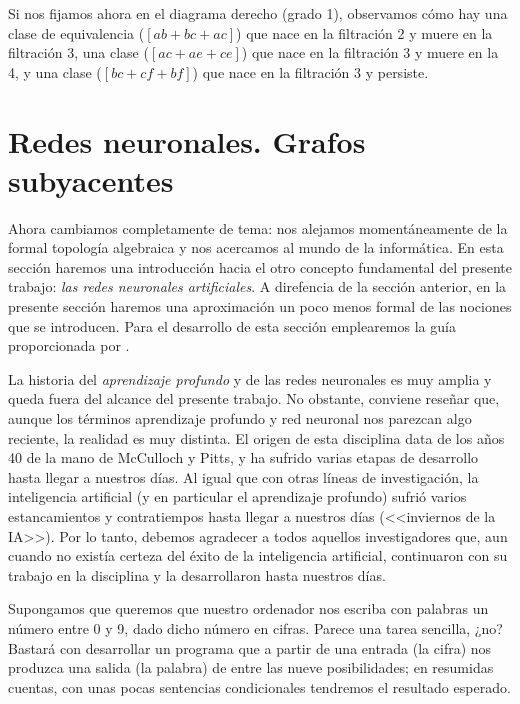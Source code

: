 \documentclass[12pt, a4paper, twoside]{book}
\numberwithin{equation}{section}
\theoremstyle{definition}
\newenvironment{ejem}
  {\pushQED{\qed}\renewcommand{\qedsymbol}{$\blacktriangleleft$}\ejemplo}
  {\popQED\endejemplo}
\theoremstyle{remark}
\theoremstyle{plain}
\begin{document}
\begin{ejem}
	Si nos fijamos ahora en el diagrama derecho (grado 1), observamos cómo
	hay una clase de equivalencia ($[ab+bc+ac]$) que nace en la filtración 
	2
	y muere en la filtración 3, una clase ($[ac+ae+ce]$) que nace en la 
	filtración 3 y muere en la 4, y una clase ($[bc+cf+bf]$) que nace en 
	la 
	filtración 3 y persiste.

	\end{ejem}

	\section{Redes neuronales. Grafos subyacentes}
	
	Ahora cambiamos completamente de tema: nos alejamos momentáneamente de 
	la formal topología algebraica y nos acercamos al mundo 
	de la informática. En esta sección haremos una
	introducción hacia el otro concepto fundamental del presente trabajo: 
	\emph{las redes neuronales artificiales}. A direfencia de la sección 
	anterior, en la presente sección haremos una aproximación un poco menos 
	formal de las nociones que se introducen. Para el desarrollo de esta 
	sección emplearemos la guía proporcionada por 
	\cite{Goodfellow-et-al-2016,IA-Jonathan,MDiscreta-Guti}.

	La historia del \emph{aprendizaje profundo} y de las redes neuronales 
	es muy amplia y queda fuera del alcance del presente trabajo. No 
	obstante, conviene reseñar que, aunque los términos aprendizaje 
	profundo y red neuronal nos parezcan algo reciente, la realidad es muy
	distinta. El origen de esta disciplina data de los años 40 de la mano
	de McCulloch y Pitts, y ha sufrido varias etapas de desarrollo hasta 
	llegar a nuestros días. Al igual que con otras líneas de 
	investigación, la inteligencia artificial (y en particular el 
	aprendizaje profundo) sufrió varios estancamientos y contratiempos 
	hasta llegar a nuestros días (<<inviernos de la IA>>). Por lo tanto, 
	debemos agradecer a todos aquellos investigadores que, aun cuando no 
	existía certeza del éxito de la inteligencia artificial, continuaron 
	con su trabajo en la disciplina y la desarrollaron hasta nuestros 
	días.

	Supongamos que queremos que nuestro ordenador nos escriba con palabras
	un número entre 0 y 9, dado dicho número en cifras. Parece una tarea 
	sencilla, ¿no?
	Bastará con desarrollar un programa que a partir de una entrada (la 
	cifra) nos produzca una salida (la palabra) de entre las nueve 
	posibilidades; en resumidas cuentas, con unas pocas sentencias 
	condicionales tendremos el resultado esperado.  
\end{document}
